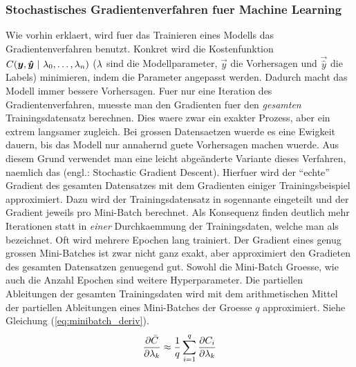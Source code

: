\documentclass[../main]{subfiles}
\begin{document}



\subsubsection{Stochastisches Gradientenverfahren fuer Machine Learning}
Wie vorhin erklaert, wird fuer das Trainieren eines Modells das Gradientenverfahren benutzt.
Konkret wird die Kostenfunktion $C(\vec{y},\vec{\hat{y}}\ |\ \param_0,\ldots,\param_n)$
($\lambda$ sind die Modellparameter, $\vec{y}$ die Vorhersagen und $\vec{\hat{y}}$
die Labels) minimieren, indem die Parameter angepasst werden. Dadurch macht das Modell immer bessere Vorhersagen.
Fuer nur eine Iteration des Gradientenverfahren, muesste man den Gradienten fuer den
\textit{gesamten} Trainingsdatensatz berechnen.
Dies waere zwar ein exakter Prozess, aber ein extrem langsamer zugleich.
Bei grossen Datensaetzen wuerde es eine Ewigkeit dauern, bis das Modell nur annahernd guete Vorhersagen machen wuerde.
\para{}
Aus diesem Grund verwendet man eine leicht abgeänderte Variante dieses Verfahren, naemlich das  (engl.: Stochastic Gradient Descent).
Hierfuer wird der ``echte'' Gradient des gesamten Datensatzes mit dem Gradienten einiger Trainingsbeispiel approximiert.
Dazu wird der Trainingsdatensatz in sogennante  eingeteilt und der Gradient jeweils pro Mini-Batch berechnet.
Als Konsequenz finden deutlich mehr Iterationen statt in \textit{einer}
Durchkaemmung der Trainingsdaten, welche man als  bezeichnet. Oft wird mehrere Epochen lang trainiert.
Der Gradient eines genug grossen Mini-Batches ist zwar nicht ganz exakt, aber approximiert den Gradieten des gesamten Datensatzen genuegend gut.
Sowohl die Mini-Batch Groesse, wie auch die Anzahl Epochen sind weitere Hyperparameter.
\para{}
Die partiellen Ableitungen der gesamten Trainingsdaten wird mit dem arithmetischen Mittel der partiellen Ableitungen eines Mini-Batches der Groesse $q$ approximiert. Siehe Gleichung (\ref{eq:minibatch_deriv}).
\begin{equation}\label{eq:minibatch_deriv}
  \frac{\partial \bar{C}}{\partial \lambda_k} \approx \frac{1}{q}\sum_{i=1}^{q} \frac{\partial C_i}{\partial \lambda_k}
\end{equation}
\end{document}
